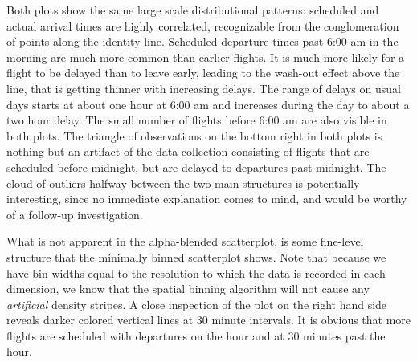 \documentclass[11pt]{isuthesis}\usepackage[]{graphicx}\usepackage[]{color}
\begin{document}
Both plots show the same large scale distributional patterns: scheduled and actual arrival times are highly correlated, recognizable from the conglomeration of points along the identity line. Scheduled departure times past 6:00 am in the morning are much more common than earlier flights. It is much more likely for a  flight to be delayed than to leave early, leading to the wash-out effect above the line, that is getting thinner with increasing delays. The range of delays on usual days starts at about one hour at 6:00 am and increases during the day to about a two hour delay. The small number of flights before 6:00 am are also visible in both plots. The triangle of observations on the bottom right in both plots is nothing but an artifact of the data collection consisting of flights that are scheduled before midnight, but are delayed to departures past midnight. The cloud of outliers halfway between the two main structures is potentially interesting, since no immediate explanation comes to mind, and would be worthy of a follow-up investigation.

What is not apparent in the alpha-blended scatterplot, is some fine-level structure that the minimally binned scatterplot shows. Note that because we have bin widths equal to the resolution to which the data is recorded in each dimension, we know that the spatial binning algorithm will not cause any \textit{artificial} density stripes. A close inspection of the plot on the right hand side reveals darker colored vertical lines at 30 minute intervals. It is obvious that more flights are scheduled with departures on the hour and at 30 minutes past the hour. 
\end{document}
